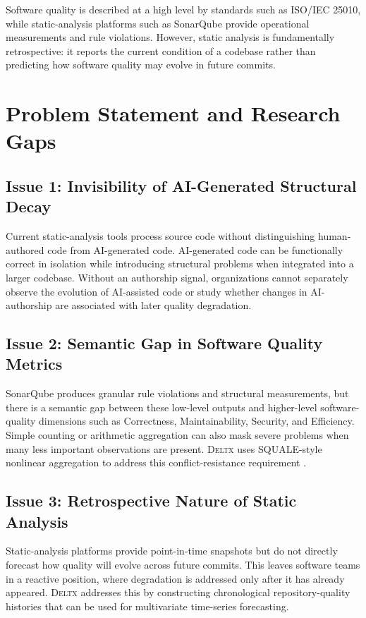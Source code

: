 \documentclass[12pt,a4paper,oneside]{report}
\newcommand{\systemname}{\textsc{Deltx}}
\begin{document}
Software quality is described at a high level by standards such as ISO/IEC 25010, while static-analysis platforms such as SonarQube provide operational measurements and rule violations. However, static analysis is fundamentally retrospective: it reports the current condition of a codebase rather than predicting how software quality may evolve in future commits.

\section{Problem Statement and Research Gaps}

\subsection{Issue 1: Invisibility of AI-Generated Structural Decay}
Current static-analysis tools process source code without distinguishing human-authored code from AI-generated code. AI-generated code can be functionally correct in isolation while introducing structural problems when integrated into a larger codebase. Without an authorship signal, organizations cannot separately observe the evolution of AI-assisted code or study whether changes in AI-authorship are associated with later quality degradation.

\subsection{Issue 2: Semantic Gap in Software Quality Metrics}
SonarQube produces granular rule violations and structural measurements, but there is a semantic gap between these low-level outputs and higher-level software-quality dimensions such as Correctness, Maintainability, Security, and Efficiency. Simple counting or arithmetic aggregation can also mask severe problems when many less important observations are present. \systemname{} uses SQUALE-style nonlinear aggregation to address this conflict-resistance requirement \citep{squale_model_practice_based_industrial_quality_model,software_quality_metrics_aggregation_industry}.

\subsection{Issue 3: Retrospective Nature of Static Analysis}
Static-analysis platforms provide point-in-time snapshots but do not directly forecast how quality will evolve across future commits. This leaves software teams in a reactive position, where degradation is addressed only after it has already appeared. \systemname{} addresses this by constructing chronological repository-quality histories that can be used for multivariate time-series forecasting.
\end{document}
